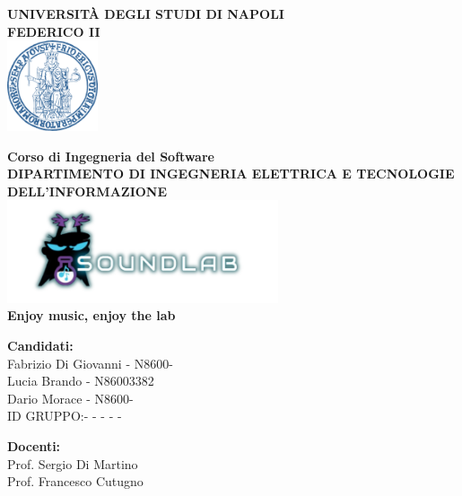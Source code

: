 \documentclass{article}
\begin{document}
	\begin{center}
		\textbf{UNIVERSITÀ DEGLI STUDI DI NAPOLI \\ FEDERICO II}
		\\
		\vspace{1cm}
		\includegraphics[width=0.2\textwidth]{logo_universita.png} 
	\end{center}
	
	\vspace{1cm}
	
	\begin{center}
		\textbf{Corso di Ingegneria del Software} \\
		\vspace{0.5cm}
		\textbf{DIPARTIMENTO DI INGEGNERIA ELETTRICA E TECNOLOGIE DELL'INFORMAZIONE} \\
		\vspace{0.5cm}
		\includegraphics[width=0.6\textwidth]{logo_sfondo} \\
		\textbf{\textcolor{dark_purple}{Enjoy music, enjoy the lab}}
		
	\end{center}
	
	\vspace{0.5cm}
	
	\begin{center}
		\textbf{Candidati:} \\
		Fabrizio Di Giovanni - N8600- \\
		Lucia Brando - N86003382 \\
		Dario Morace - N8600- \\
		ID GRUPPO:- - - - -\\
	\end{center}
	
	\vspace{0.5cm}
	
	\begin{center}
		\textbf{Docenti:} \\
		Prof. Sergio Di Martino \\
		Prof. Francesco Cutugno
	\end{center}
	
\end{document}

